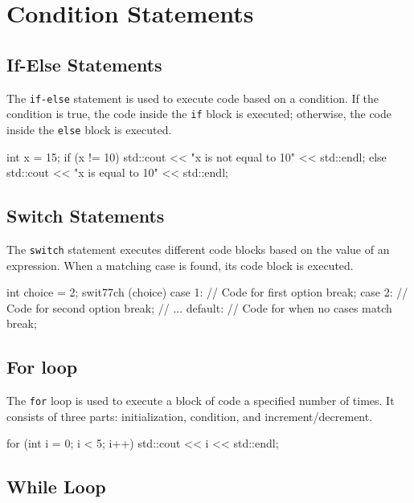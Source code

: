 \section{Condition Statements}

\subsection{If-Else Statements}

The \texttt{if-else} statement is used to execute code based on a condition. If the condition is true, the code inside the \texttt{if} block is executed; otherwise, the code inside the \texttt{else} block is executed.

\begin{codeblock}[language=C++]
int x = 15;
if (x != 10) {
    std::cout << "x is not equal to 10" << std::endl;
} else {
    std::cout << "x is equal to 10" << std::endl;
}
\end{codeblock}

\subsection{Switch Statements}

The \texttt{switch} statement executes different code blocks based on the value of an expression. When a matching case is found, its code block is executed.

\begin{codeblock}[language=C++]
int choice = 2;
swit77ch (choice) {
    case 1:
        // Code for first option
        break;
    case 2:
        // Code for second option
        break;
    // ...
    default:
        // Code for when no cases match
        break;
}
\end{codeblock}

\subsection{For loop}

The \texttt{for} loop is used to execute a block of code a specified number of times. It consists of three parts: initialization, condition, and increment/decrement.

\begin{codeblock}[language=C++]
for (int i = 0; i < 5; i++) {
    std::cout << i << std::endl;
}
\end{codeblock}

\subsection{While Loop}

